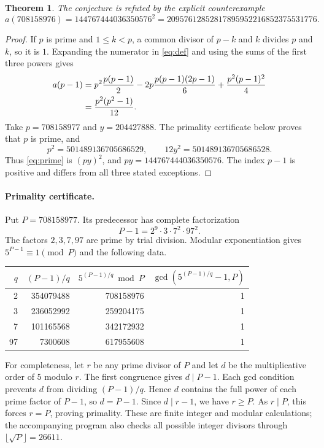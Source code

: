 \documentclass[11pt]{article}
\newtheorem{theorem}{Theorem}
\begin{document}
\begin{theorem}\label{thm:counterexample}
The conjecture is refuted by the explicit counterexample
\[
 a(708158976)=144767444036350576^2
 =20957612852817895952216852375531776.
\]
\end{theorem}

\begin{proof}
If $p$ is prime and $1\leq k<p$, a common divisor of $p-k$ and $k$
divides $p$ and $k$, so it is $1$. Expanding the numerator in
\eqref{eq:def} and using the sums of the first three powers gives
\begin{align}
 a(p-1)
 &=p^2\frac{p(p-1)}2
   -2p\frac{p(p-1)(2p-1)}6
   +\frac{p^2(p-1)^2}4\notag\\
 &=\frac{p^2(p^2-1)}{12}.\label{eq:prime}
\end{align}
Take $p=708158977$ and $y=204427888$. The primality certificate
below proves that $p$ is prime, and
\[
 p^2=501489136705686529,
 \qquad 12y^2=501489136705686528.
\]
Thus \eqref{eq:prime} is $(py)^2$, and
$py=144767444036350576$. The index $p-1$ is positive and differs
from all three stated exceptions.
\end{proof}

\paragraph{Primality certificate.}
Put $P=708158977$. Its predecessor has complete factorization
\[
 P-1=2^9\cdot3\cdot7^2\cdot97^2.
\]
The factors $2,3,7,97$ are prime by trial division. Modular
exponentiation gives $5^{P-1}\equiv1\pmod P$ and the following data.
\begin{center}
\begin{tabular}{rrrr}
\toprule
$q$ & $(P-1)/q$ & $5^{(P-1)/q}\bmod P$ & $\gcd(5^{(P-1)/q}-1,P)$\\
\midrule
2 & 354079488 & 708158976 & 1\\
3 & 236052992 & 259204175 & 1\\
7 & 101165568 & 342172932 & 1\\
97 & 7300608 & 617955608 & 1\\
\bottomrule
\end{tabular}
\end{center}
For completeness, let $r$ be any prime divisor of $P$ and let $d$
be the multiplicative order of $5$ modulo $r$. The first congruence
gives $d\mid P-1$. Each gcd condition prevents $d$ from dividing
$(P-1)/q$. Hence $d$ contains the full power of each prime factor
of $P-1$, so $d=P-1$. Since $d\mid r-1$, we have $r\geq P$.
As $r\mid P$, this forces $r=P$, proving primality. These are finite
integer and modular calculations; the accompanying program also
checks all possible integer divisors through $\lfloor\sqrt P\rfloor=26611$.
\end{document}
